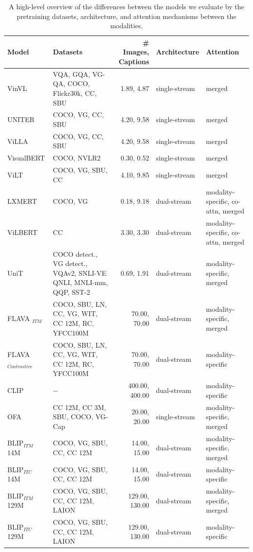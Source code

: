 \begin{table}[ht]
    \centering
    \small
    \begin{adjustbox}{max width=\textwidth}
    \begin{tabular}{l|lr|l|l}
    \toprule
    Model & Datasets & \# Images, Captions & Architecture & Attention \\\midrule
    VinVL \cite{zhang2021vinvl}  & VQA, GQA, VG-QA, COCO, Flickr30k, CC, SBU & 1.89, 4.87 & single-stream & merged \\
    UNITER \cite{chen2020uniter}  & COCO, VG, CC, SBU & 4.20, 9.58 & single-stream  &  merged \\
    ViLLA \cite{gan2020villa} & COCO, VG, CC, SBU  & 4.20, 9.58 & single-stream  &  merged \\
    VisualBERT \cite{li2019visualbert}& COCO, NVLR2 & 0.30, 0.52  & single-stream  & merged \\
    ViLT \cite{kim2021vilt}  & COCO, VG, SBU, CC & 4.10, 9.85 & single-stream  & merged \\
    LXMERT \cite{tan2020lxmert}  & COCO, VG & 0.18, 9.18 & dual-stream & modality-specific, co-attn, merged \\
    ViLBERT \cite{lu2019vilbert}  & CC & 3.30, 3.30 & dual-stream  & modality-specific, co-attn, merged \\
    UniT \cite{hu2021unit} & COCO detect., VG detect., VQAv2, SNLI-VE QNLI, MNLI-mm, QQP, SST-2 & 0.69, 1.91 & dual-stream & modality-specific, merged\\
    FLAVA $_{ITM}$ \cite{singh2022flava}  & COCO, SBU, LN, CC, VG, WIT, CC 12M, RC, YFCC100M & 70.00, 70.00 & dual-stream & modality-specific, merged \\
    FLAVA $_{Contrastive}$ \cite{singh2022flava}  & COCO, SBU, LN, CC, VG, WIT, CC 12M, RC, YFCC100M & 70.00, 70.00 & dual-stream & modality-specific \\
    CLIP \cite{radford2021clip}  & $-$ & 400.00, 400.00 & dual-stream & modality-specific \\
    \midrule
    OFA \cite{wang2022unifying} &  CC 12M, CC 3M, SBU, COCO, VG-Cap  &  20.00, 20.00 &   single-stream & modality-specific, merged \\
    BLIP$_{ITM}$ 14M \cite{li2022blip} &  COCO, VG, SBU, CC, CC 12M  &  14.00, 15.00 &   dual-stream & modality-specific, merged \\
    BLIP$_{ITC}$ 14M \cite{li2022blip} &  COCO, VG, SBU, CC, CC 12M & 14.00, 15.00 &   dual-stream &         modality-specific \\
    BLIP$_{ITM}$ 129M \cite{li2022blip} & COCO, VG, SBU, CC, CC 12M, LAION & 129.00,   130.00 &   dual-stream & modality-specific, merged \\
    BLIP$_{ITC}$ 129M \cite{li2022blip} & COCO, VG, SBU, CC, CC 12M, LAION & 129.00,   130.00 &   dual-stream &         modality-specific \\
    \bottomrule
    \end{tabular}
    \end{adjustbox}
    \caption{A high-level overview of the differences between the models we evaluate by the pretraining datasets, architecture, and attention mechanisms between the modalities.}
    \label{tab:model-types}
\end{table}

